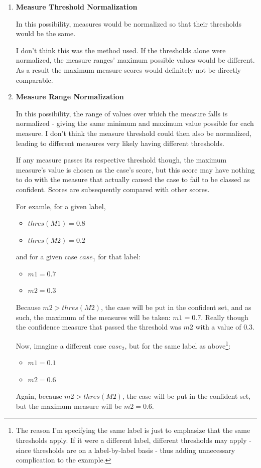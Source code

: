 \documentclass[a4paper,11pt]{report}
\begin{document}
\begin{enumerate}
	\item \textbf{Measure Threshold Normalization}
	
	In this possibility, measures would be normalized so that their thresholds would be the same.
	
	I don't think this was the method used. If the thresholds alone were normalized, the measure ranges' maximum possible values would be different. As a result the maximum measure scores would definitely not be directly comparable.
	
	\item \textbf{Measure Range Normalization}
	
	In this possibility, the range of values over which the measure falls is normalized - giving the same minimum and maximum value possible for each measure. I don't think the measure threshold could then also be normalized, leading to different measures very likely having different thresholds. 
	
	If any measure passes its respective threshold though, the maximum measure's value is chosen as the case's score, but this score may have nothing to do with the measure that actually caused the case to fail to be classed as confident. Scores are subsequently compared with other scores.
	
	\begin{samepage}
	For examle, for a given label, 
	\begin{itemize}
		\item $thres(M1) = 0.8$
		\item $thres(M2) = 0.2$
	\end{itemize}
	and for a given case $case_{1}$ for that label:
	\begin{itemize}
		\item $m1 = 0.7$
		\item $m2 = 0.3$
	\end{itemize}  
	\end{samepage}
	Because $m2 > thres(M2)$, the case will be put in the confident set, and as such, the maximum of the measures will be taken: $m1=0.7$. Really though the confidence measure that passed the threshold was $m2$ with a value of $0.3$.
	
	Now, imagine a different case $case_{2}$, but for the same label as above\footnote{The reason I'm specifying the same label is just to emphasize that the same thresholds apply. If it were a different label, different thresholds may apply - since thresholds are on a label-by-label basis - thus adding unnecessary complication to the example.}:
	\begin{itemize}
		\item $m1 = 0.1$
		\item $m2 = 0.6$
	\end{itemize}
	Again, because $m2 > thres(M2)$, the case will be put in the confident set, but the maximum measure will be $m2 = 0.6$. 
	

\end{enumerate}
\end{document}
